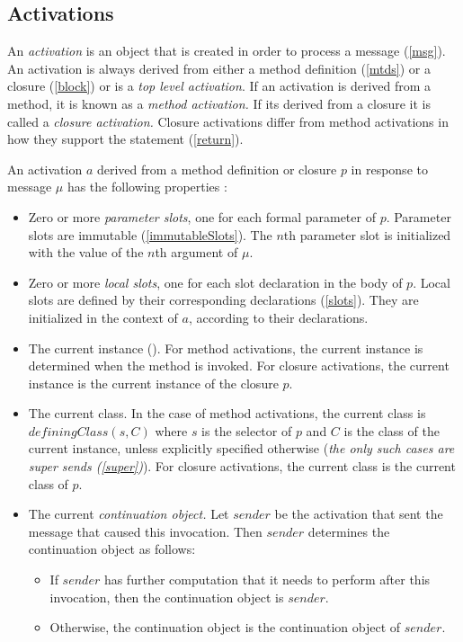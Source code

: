 \documentclass{article}
\begin{document}
\subsection{Activations}
\label{activations}

An {\em activation} is an object that is created in order to process a message (\ref{msg}). An activation is always  derived from either a method definition (\ref{mtds}) or a closure (\ref{block}) or is a {\em top level activation}. If an activation is derived from a method,  it is  known as a {\em method activation.} If its derived from a closure it is  called a {\em closure activation.} Closure activations differ from method activations in how they support the \RETURN{} statement (\ref{return}).   

An activation $a$ derived from a method definition or closure $p$ in response to message $\mu$ has the following properties :
\begin{itemize}
\item Zero or more {\em parameter slots}, one for each formal parameter of $p$. Parameter slots are immutable (\ref{immutableSlots}). The $n$th parameter slot is initialized with the value of the $n$th argument of $\mu$.
\item Zero or more {\em local slots}, one for each slot declaration in the body of $p$. Local slots are defined by their corresponding declarations (\ref{slots}). They are initialized  in the context of $a$,  according to their declarations.
\item 
The current instance (\SELF). For method activations, the current instance is determined when the method is invoked. For closure activations, the current instance is the current instance of the closure $p$.
\item The current class. In the case of method activations, the current class is $definingClass(s, C)$ where $s$ is the selector of $p$ and $C$ is the class of the current instance, unless  explicitly specified otherwise
({\it the only such cases are super sends (\ref{super})}). For closure activations, the current class is the current class of $p$.
\item
The current {\em continuation object.} Let $sender$ be the activation that sent the message that  caused this invocation. Then $sender$ determines the continuation object as follows:
  \begin{itemize} 
  \item If $sender$ has further computation that it needs to perform after this invocation, then the continuation object is $sender$.
   \item Otherwise, the continuation object is the continuation object of $sender$.
  \end{itemize}
\end{itemize}
\end{document}
